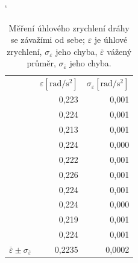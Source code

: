 \documentclass[english]{article}
\newcommand{\unit}[1]{\mathrm{#1}}
\begin{document}
\begin{table}[h]
\catcode` %
\parbox{.45\linewidth}{
\centering
    \begin{tabular}{|r|r|r|}
\cline{2-3}    \multicolumn{1}{r|}{} & $\varepsilon \unit{[ rad/s^2]}$ & $\sigma_{\varepsilon}\unit{ [rad/s^2]}$ \bigstrut\\
\cline{2-3}    \multicolumn{1}{r|}{} & 0,223 & 0,001 \bigstrut\\
\cline{2-3}    \multicolumn{1}{r|}{} & 0,224 & 0,001 \bigstrut\\
\cline{2-3}    \multicolumn{1}{r|}{} & 0,213 & 0,001 \bigstrut\\
\cline{2-3}    \multicolumn{1}{r|}{} & 0,224 & 0,000 \bigstrut\\
\cline{2-3}    \multicolumn{1}{r|}{} & 0,222 & 0,001 \bigstrut\\
\cline{2-3}    \multicolumn{1}{r|}{} & 0,226 & 0,001 \bigstrut\\
\cline{2-3}    \multicolumn{1}{r|}{} & 0,224 & 0,001 \bigstrut\\
\cline{2-3}    \multicolumn{1}{r|}{} & 0,224 & 0,000 \bigstrut\\
\cline{2-3}    \multicolumn{1}{r|}{} & 0,219 & 0,001 \bigstrut\\
\cline{2-3}    \multicolumn{1}{r|}{} & 0,224 & 0,001 \bigstrut\\
    \hline
    $\overline{\varepsilon} \pm \sigma_{\overline{\varepsilon}}$ & 0,2235 & 0,0002 \bigstrut\\
    \hline
    \end{tabular}%

      
   
  \caption{Měření úhlového zrychlení dráhy se závažími od sebe; $\varepsilon$ je úhlové zrychlení, $\sigma_{\varepsilon}$ jeho chyba, $\overline{\varepsilon}$ vážený průměr, $\sigma_{\overline{\varepsilon}}$ jeho chyba.}
    \label{tab:zzmh_zavazi_odsebe}%

}
\end{table}
\end{document}
